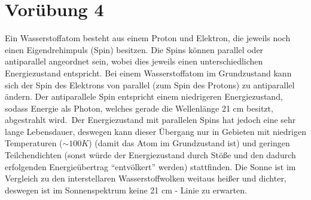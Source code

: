 \documentclass[titlepage]{scrartcl}
\begin{document}
\section{Vorübung 4}
Ein Wasserstoffatom besteht aus einem Proton und Elektron, die jeweils noch einen Eigendrehimpuls (Spin) besitzen. Die Spins können parallel oder antiparallel angeordnet sein, wobei dies jeweils einen unterschiedlichen Energiezustand entspricht. Bei einem Wasserstoffatom im Grundzustand kann sich der Spin des Elektrons von parallel (zum Spin des Protons) zu antiparallel ändern. Der antiparallele Spin entspricht einem niedrigeren Energiezustand, sodass Energie als Photon, welches gerade die Wellenlänge 21 cm besitzt, abgestrahlt wird.\
Der Energiezustand mit parallelen Spins hat jedoch eine sehr lange Lebensdauer, deswegen kann dieser Übergang nur in Gebieten mit niedrigen Temperaturen ($\sim 100K$) (damit das Atom im Grundzustand ist) und geringen Teilchendichten (sonst würde der Energiezustand durch Stöße und den dadurch erfolgenden Energieübertrag \enquote{entvölkert} werden) stattfinden. Die Sonne ist im Vergleich zu den interstellaren Wasserstoffwolken weitaus heißer und dichter, deswegen ist im Sonnenspektrum keine 21 cm - Linie zu erwarten.
\end{document}
